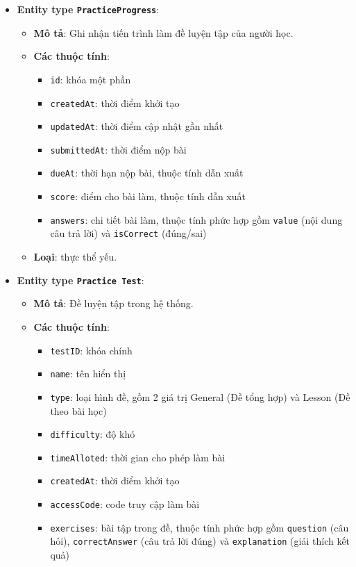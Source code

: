 \begin{itemize}
\item \textbf{Entity type \texttt{PracticeProgress}}:
\begin{itemize}
    \item \textbf{Mô tả}: Ghi nhận tiến trình làm đề luyện tập của người học.
    
    \item \textbf{Các thuộc tính}:
    \begin{itemize}
        \item \texttt{id}: khóa một phần
        \item \texttt{createdAt}: thời điểm khởi tạo
        \item \texttt{updatedAt}: thời điểm cập nhật gần nhất
        \item \texttt{submittedAt}: thời điểm nộp bài
        \item \texttt{dueAt}: thời hạn nộp bài, thuộc tính dẫn xuất
        \item \texttt{score}: điểm cho bài làm, thuộc tính dẫn xuất
        \item \texttt{answers}: chi tiết bài làm, thuộc tính phức hợp gồm \texttt{value} (nội dung câu trả lời) và \texttt{isCorrect} (đúng/sai)
    \end{itemize}
    
    \item \textbf{Loại}: thực thể yếu.
\end{itemize}


\item \textbf{Entity type \texttt{Practice Test}}:
\begin{itemize}
    \item \textbf{Mô tả}: Đề luyện tập trong hệ thống.
    
    \item \textbf{Các thuộc tính}:
    \begin{itemize}
        \item \texttt{testID}: khóa chính
        \item \texttt{name}: tên hiển thị
        \item \texttt{type}: loại hình đề, gồm 2 giá trị General (Đề tổng hợp) và Lesson (Đề theo bài học)
        \item \texttt{difficulty}: độ khó
        \item \texttt{timeAlloted}: thời gian cho phép làm bài
        \item \texttt{createdAt}: thời điểm khởi tạo
        \item \texttt{accessCode}: code truy cập làm bài
        \item \texttt{exercises}: bài tập trong đề, thuộc tính phức hợp gồm \texttt{question} (câu hỏi), \texttt{correctAnswer} (câu trả lời đúng) và \texttt{explanation} (giải thích kết quả)
    \end{itemize}


\end{itemize}
\end{itemize}
